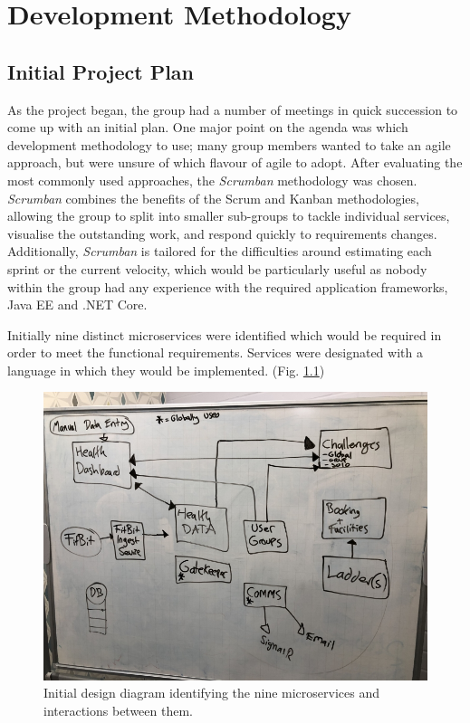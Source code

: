 \chapter{Development Methodology}

\section{Initial Project Plan}
As the project began, the group had a number of meetings in quick succession to come up with an initial plan. One major point on the agenda was which development methodology to use; many group members wanted to take an agile approach, but were unsure of which flavour of agile to adopt. After evaluating the most commonly used approaches, the \textit{Scrumban}\cite{scrumban} methodology was chosen. \textit{Scrumban} combines the benefits of the Scrum and Kanban methodologies, allowing the group to split into smaller sub-groups to tackle individual services, visualise the outstanding work, and respond quickly to requirements changes. Additionally, \textit{Scrumban} is tailored for the difficulties around estimating each sprint or the current velocity, which would be particularly useful as nobody within the group had any experience with the required application frameworks, Java EE and .NET Core. 

Initially nine distinct microservices were identified which would be required in order to meet the functional requirements. Services were designated with a language in which they would be implemented. (Fig. \ref{fig:initial_spec_chart})

\begin{figure}[H]
    \centering
    \includegraphics[width=\textwidth]{Images/Initial_Spec_Chart.jpg}
    \caption{Initial design diagram identifying the nine microservices and interactions between them.}
    \label{fig:initial_spec_chart}
\end{figure}

